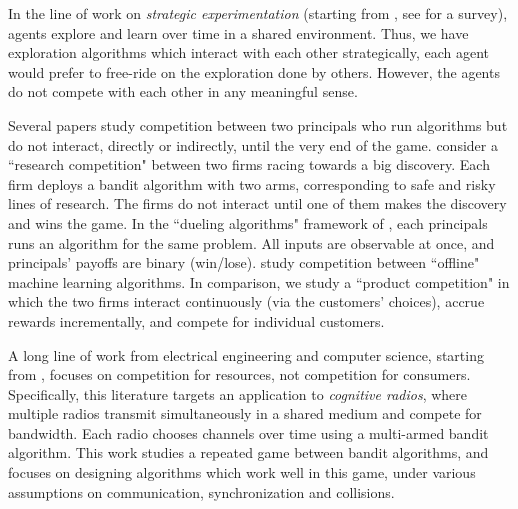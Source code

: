 In the line of work on \emph{strategic experimentation} (starting from \citet{Bolton-econometrica99,Keller-econometrica05}, see \citet{Horner-survey16} for a survey), agents explore and learn over time in a shared environment. Thus, we have exploration algorithms which interact with each other strategically, \eg each agent would prefer to free-ride on the exploration done by others. However, the agents do not compete with each other in any meaningful sense.

Several papers study competition between two principals who run algorithms but do not interact, directly or indirectly, until the very end of the game. \cite{Ufuk-jeea15} consider a ``research competition" between two firms racing towards a big discovery.
Each firm deploys a bandit algorithm with two arms, corresponding to safe and risky lines of research. The firms do not interact until one of them makes the discovery and wins the game. In the ``dueling algorithms" framework of \citet{DuelingAlgs-stoc11}, each principals runs an algorithm for the same problem. All inputs are observable at once, and principals' payoffs are binary (win/lose). \citet{ben2017best, ben2019regression} study competition between ``offline" machine learning algorithms. In comparison, we study a ``product competition" in which the two firms interact continuously (via the customers' choices), accrue rewards incrementally, and compete for individual customers.


A long line of work from electrical engineering and computer science, starting from
\citet{MultiPlayerMAB-Poor08,MultiPlayerMAB-Liu10,MultiPlayerMAB-Anima11}, focuses on competition for resources, not competition for consumers. Specifically, this literature targets an application to \emph{cognitive radios}, where multiple radios transmit simultaneously in a shared medium and compete for bandwidth. Each radio chooses channels over time using a multi-armed bandit algorithm. This work studies a repeated game between bandit algorithms, and focuses on designing algorithms which work well in this game, under various assumptions on communication, synchronization and collisions.




